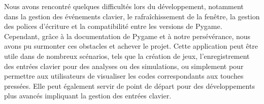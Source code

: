 \documentclass[a4paper, 12px]{article}
\begin{document}
Nous avons rencontré quelques difficultés lors du développement, notamment dans la gestion des événements clavier, le rafraîchissement de la fenêtre, la gestion des polices d'écriture et la compatibilité entre les versions de Pygame. Cependant, grâce à la documentation de Pygame et à notre persévérance, nous avons pu surmonter ces obstacles et achever le projet.
Cette application peut être utile dans de nombreux scénarios, tels que la création de jeux, l'enregistrement des entrées clavier pour des analyses ou des simulations, ou simplement pour permettre aux utilisateurs de visualiser les codes correspondants aux touches pressées. Elle peut également servir de point de départ pour des développements plus avancés impliquant la gestion des entrées clavier.
\end{document}
